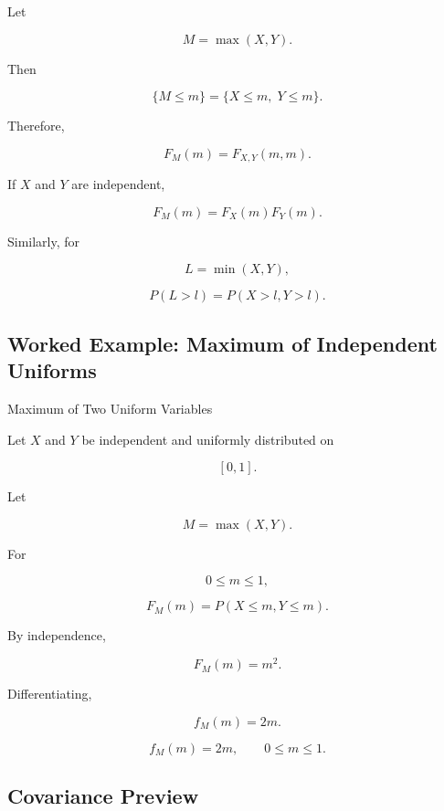 Let

\[
M=\max(X,Y).
\]

Then

\[
\{M\leq m\}
=
\{X\leq m,\;Y\leq m\}.
\]

Therefore,

\[
\boxed{
F_M(m)
=
F_{X,Y}(m,m).
}
\]

If \(X\) and \(Y\) are independent,

\[
\boxed{
F_M(m)
=
F_X(m)F_Y(m).
}
\]

Similarly, for

\[
L=\min(X,Y),
\]

\[
\boxed{
P(L>l)
=
P(X>l,Y>l).
}
\]

\subsection{Worked Example: Maximum of Independent Uniforms}
\label{subsec:worked-max-uniforms}

\begin{workedexamplebox}{Maximum of Two Uniform Variables}

Let \(X\) and \(Y\) be independent and uniformly distributed on

\[
[0,1].
\]

Let

\[
M=\max(X,Y).
\]

For

\[
0\leq m\leq1,
\]

\[
F_M(m)
=
P(X\leq m,Y\leq m).
\]

By independence,

\[
F_M(m)
=
m^2.
\]

Differentiating,

\[
f_M(m)=2m.
\]

\begin{answerbox}
\[
\boxed{
f_M(m)=2m,
\qquad
0\leq m\leq1.
}
\]
\end{answerbox}

\end{workedexamplebox}

\subsection{Covariance Preview}
\label{subsec:covariance-preview-joint}

